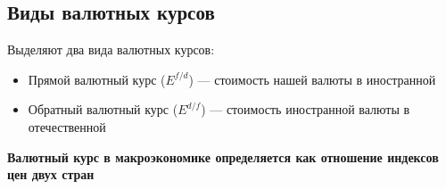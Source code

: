 \documentclass{article}
\begin{document}
    \subsection{Виды валютных курсов}

    Выделяют два вида валютных курсов:

    \begin{itemize}
        \item Прямой валютный курс ($E^{f / d}$) --- стоимость нашей валюты в иностранной
        \item Обратный валютный курс ($E^{d / f}$) --- стоимость иностранной валюты в отечественной
    \end{itemize}

    \quad

    \textbf{Валютный курс в макроэкономике определяется как отношение индексов цен двух стран}
\end{document}
